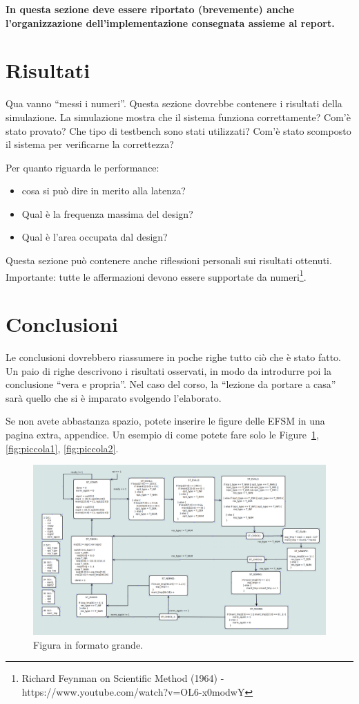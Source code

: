 \documentclass[]{IEEEtran}
\begin{document}
\textbf{In questa sezione deve essere riportato (brevemente) anche l'organizzazione dell'implementazione consegnata assieme al report.}

\section{Risultati}

Qua vanno ``messi i numeri''. Questa sezione dovrebbe contenere i risultati della simulazione. La simulazione mostra che il sistema funziona correttamente? Com'è stato provato? Che tipo di testbench sono stati utilizzati? Com'è stato scomposto il sistema per verificarne la correttezza?

Per quanto riguarda le performance:
\begin{itemize}
\item cosa si può dire in merito alla latenza?
\item Qual è la frequenza massima del design? 
\item Qual è l'area occupata dal design? 
\end{itemize}

Questa sezione può contenere anche riflessioni personali sui risultati ottenuti. Importante: tutte le affermazioni devono essere supportate da numeri\footnote{Richard Feynman on Scientific Method (1964) -\\ https://www.youtube.com/watch?v=OL6-x0modwY}.

\section{Conclusioni}
Le conclusioni dovrebbero riassumere in poche righe  tutto ciò che è stato fatto. Un paio di righe descrivono i risultati osservati, in modo da introdurre poi la conclusione ``vera e propria''. Nel caso del corso, la ``lezione da portare a casa'' sarà quello che si è imparato svolgendo l'elaborato.





\appendix
Se non avete abbastanza spazio, potete inserire le figure delle EFSM in una  pagina extra, appendice. Un esempio di come potete fare solo le Figure~\ref{fig:grande}, \ref{fig:piccola1}, \ref{fig:piccola2}.


\begin{figure}[bt]
\centering
\includegraphics[width=\textwidth]{figures/EFSM-multiplier}
\caption{Figura in formato grande.}
\label{fig:grande}
\end{figure}
\end{document}
